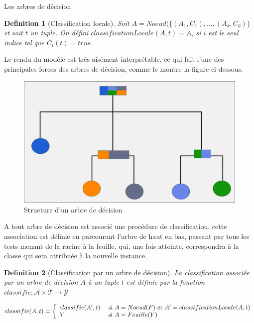 \documentclass[a4paper, 11pt]{report}
\newtheorem{definition}{Definition}
\newcommand{\tupleset}{\ensuremath{\mathcal{T}}}
\newcommand{\arbreset}{\ensuremath{\mathcal{A}}}
\newcommand{\classeset}{\ensuremath{\mathcal{Y}}}
\begin{document}
\begin{chapter}{Les arbres de décision}
\begin{definition}[Classification locale]
  Soit $A=Noeud(\{(A_1,C_1),\dots,(A_k,C_k)\}$ et soit $t$ un tuple.
  On défini $classificationLocale(A,t)=A_i$ si $i$ est le seul indice tel que $C_i(t)=true$.
\end{definition}

Le rendu du modèle est très aisément interprétable, ce qui fait l'une des principales forces des arbres de décision, comme le montre la figure ci-dessous.

\begin{figure}[!h]
\begin{center}
	\includegraphics[scale=2]{Images/arbreD.png}
	\caption{Structure d'un arbre de décision}
\end{center}
\label{Arbre}
\end{figure}
A tout arbre de décision est associé une procédure de classification, cette association est définie en parcourant l'arbre de haut en bas, passant par tous les tests menant de la racine à la feuille, qui, une fois atteinte, correspondra à la classe qui sera attribuée à la nouvelle instance.


\begin{definition}[Classification par un arbre de décision]
  La classification associée par un arbre de décision $A$ à un tuple $t$ est définie par la fonction $classifie:\arbreset\times\tupleset\rightarrow\classeset$

  $$classifie(A,t)=\left\{
    \begin{array}[c]{ll}
      classifie(A',t)&\textnormal{ si }A=Noeud(F)\textnormal{ et }A' = classificationLocale(A,t)\\
      Y&\textnormal{ si }A=Feuille(Y)
    \end{array}
  \right.
  $$
\end{definition}


\end{chapter}
\end{document}
